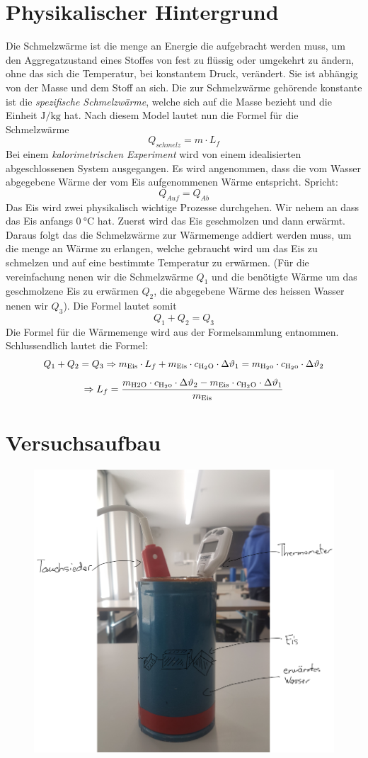 \documentclass[a4paper,12pt]{article}
\begin{document}
\section{Physikalischer Hintergrund}
Die Schmelzwärme ist die menge an Energie die aufgebracht werden muss, um den Aggregatzustand eines Stoffes von fest zu flüssig oder umgekehrt zu ändern, ohne das sich die Temperatur, bei konstantem Druck, verändert. Sie ist abhängig von der Masse und dem Stoff an sich. Die zur Schmelzwärme gehörende konstante ist die \textit{spezifische Schmelzwärme}, welche sich auf die Masse bezieht und die Einheit $\si{\J\per\kg}$ hat. Nach diesem Model lautet nun die Formel für die Schmelzwärme 
$$ Q_{schmelz}= m \cdot L_f$$
Bei einem \textit{kalorimetrischen Experiment} wird von einem idealisierten abgeschlossenen System ausgegangen. Es wird angenommen, dass die vom Wasser abgegebene Wärme der vom Eis aufgenommenen Wärme entspricht. Spricht:
$$ Q_{Auf}=Q_{Ab}$$
Das Eis wird zwei physikalisch wichtige Prozesse durchgehen. Wir nehem an dass das Eis anfangs $\SI{0}{\celsius}$ hat. Zuerst wird das Eis geschmolzen und dann erwärmt. Daraus folgt das die Schmelzwärme zur Wärmemenge addiert werden muss, um die menge an Wärme zu erlangen, welche gebraucht wird um das Eis zu schmelzen und auf eine bestimmte Temperatur zu erwärmen. (Für die vereinfachung nenen wir die Schmelzwärme $Q_{1}$ und die benötigte Wärme um das geschmolzene Eis zu erwärmen $Q_{2}$, die abgegebene Wärme des heissen Wasser nenen wir $Q_{3}$). Die Formel lautet somit
$$ Q_{1} + Q_{2} = Q_{3} $$
Die Formel für die Wärmemenge wird aus der Formelsammlung entnommen. Schlussendlich lautet die Formel:
$$ Q_{1} + Q_{2} = Q_{3} \Rightarrow m_{\rm{Eis}} \cdot L_f + m_{\rm{Eis}} \cdot c_{\rm{H_2O}} \cdot \Delta\vartheta_1 = m_{\rm{H_2o}} \cdot c_{\rm{H_2o}} \cdot \Delta\vartheta_2$$ $$ \Rightarrow L_f = \frac{m_{\rm{H2O}} \cdot c_{\rm{H_2o}} \cdot \Delta\vartheta_2 - m_{\rm{Eis}} \cdot c_{\rm{H_2O}} \cdot \Delta\vartheta_1}{m_{\rm{Eis}}}$$



\section{Versuchsaufbau}
\begin{figure}[H]
    \centering
    \includegraphics[width=.5\linewidth]{image}
\end{figure}
\end{document}
